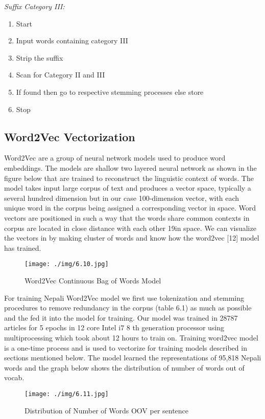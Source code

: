             \textit{Suffix Category III:}
            \begin{enumerate}
                \item Start
                \item Input words containing category III
                \item Strip the suffix
                \item Scan for Category II and III
                \item If found then go to respective stemming processes else store
                \item Stop
            \end{enumerate}
        \subsection{Word2Vec Vectorization}
Word2Vec are a group of neural network models used to produce word embeddings.
The models are shallow two layered neural network as shown in the figure below that
are trained to reconstruct the linguistic context of words. The model takes input large
corpus of text and produces a vector space, typically a several hundred dimension but
in our case 100-dimension vector, with each unique word in the corpus being assigned
a corresponding vector in space. Word vectors are positioned in such a way that the
words share common contexts in corpus are located in close distance with each other
19in space. We can visualize the vectors in by making cluster of words and know how the
word2vec [12] model has trained.

        \begin{figure}[hbt!]
            \centering
                \texttt{[image: ./img/6.10.jpg]}
                \caption{Word2Vec Continuous Bag of Words Model}
        \end{figure}
For training Nepali Word2Vec model we first use tokenization and stemming
procedures to remove redundancy in the corpus (table 6.1) as much as possible and the
fed it into the model for training. Our model was trained in 28787 articles for 5 epochs
in 12 core Intel i7 8 th generation processor using multiprocessing which took about 12
hours to train on. Training word2vec model is a one-time process and is used to
vectorize for training models described in sections mentioned below. The model
learned the representations of 95,818 Nepali words and the graph below shows the
distribution of number of words out of vocab.
        \begin{figure}[hbt!]
            \centering
                \texttt{[image: ./img/6.11.jpg]}
                \caption{Distribution of Number of Words OOV per sentence}
        \end{figure}

